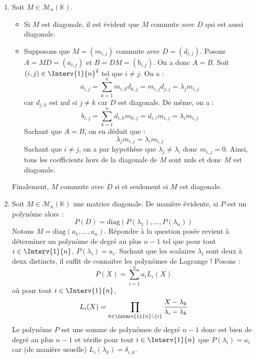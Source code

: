 \documentclass[a4paper,10pt]{report}
\begin{document}
\corr \begin{enumerate}
\item Soit $M \in \mathcal{M}_n(\mathbb{K})$. 
\begin{itemize}
\item Si $M$ est diagonale, il est évident que $M$ commute avec $D$ qui est aussi diagonale.
\item Supposons que $M=(m_{i,j})$ commute avec $D=(d_{i,j})$. Posons $A=MD=(a_{i,j})$ et $B=DM=(b_{i,j})$. On a donc $A=B$. Soit $(i,j) \in \Interv{1}{n}^2$ tel que $i \neq j$. On a :
$$ a_{i,j} = \sum_{k=1}^n m_{i,k} d_{k,j} = m_{i,j} d_{j,j} = \lambda_j m_{i,j}$$
car $d_{j,k}$ est nul si $j \neq k$ car $D$ est diagonale.
De même, on a :
$$ b_{i,j} = \sum_{k=1}^n d_{i,k} m_{k,j} = d_{i,i}m_{i,j} = \lambda_i m_{i,j}$$
Sachant que $A=B$, on en déduit que :
$$ \lambda_j m_{i,j} = \lambda_i m_{i,j}$$
Sachant que $i \neq j$, on a par hypothèse que $\lambda_j \neq \lambda_i$ donc $m_{i,j}=0$. Ainsi, tous les coefficients hors de la diagonale de $M$ sont nuls et donc $M$ est diagonale.
\end{itemize}
Finalement, $M$ commute avec $D$ si et seulement si $M$ est diagonale.
\item Soit $M \in \mathcal{M}_n(\mathbb{K})$ une matrice diagonale. De manière évidente, si $P$ est un polynôme alors :
$$ P(D) = \textrm{diag}(P(\lambda_1), \ldots, P(\lambda_n))$$
Notons $M= \textrm{diag}(a_1, \ldots, a_n)$. Répondre à la question posée revient à déterminer un polynôme de degré au plus $n-1$ tel que pour tout $i \in \Interv{1}{n}$, $P(\lambda_i)= a_i$. Sachant que les scalaires $\lambda_i$ sont deux à deux distincts, il suffit de connaitre les polynômes de Lagrange ! Posons :
$$ P(X) = \sum_{i=1}^n a_i L_i(X)$$
où pour tout $i \in \Interv{1}{n}$,
$$ L_i(X) = \prod_{k \in \Interv{1}{n} \setminus \lbrace i \rbrace} \dfrac{X-\lambda_k}{\lambda_i- \lambda_k}$$
Le polynôme $P$ est une somme de polynômes de degré $n-1$ donc est bien de degré au plus $n-1$ et vérifie pour tout $i \in \Interv{1}{n}$ que $P(\lambda_i)= a_i$ car (de manière usuelle) $L_i(\lambda_k) = \delta_{i,k}$.

\end{enumerate}
\end{document}
